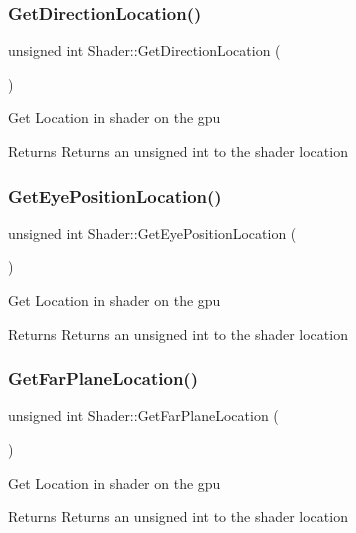 \subsubsection{\texorpdfstring{GetDirectionLocation()}{GetDirectionLocation()}}
{\footnotesize\ttfamily unsigned int Shader\+::\+Get\+Direction\+Location (\begin{DoxyParamCaption}{ }\end{DoxyParamCaption})}

Get Location in shader on the gpu \begin{DoxyReturn}{Returns}
Returns an unsigned int to the shader location 
\end{DoxyReturn}
\mbox{\label{class_shader_a653eeecb7ec14c82360ea54d1c4034f3}} 
\subsubsection{\texorpdfstring{GetEyePositionLocation()}{GetEyePositionLocation()}}
{\footnotesize\ttfamily unsigned int Shader\+::\+Get\+Eye\+Position\+Location (\begin{DoxyParamCaption}{ }\end{DoxyParamCaption})}

Get Location in shader on the gpu \begin{DoxyReturn}{Returns}
Returns an unsigned int to the shader location 
\end{DoxyReturn}
\mbox{\label{class_shader_a26b015dcb7ea6997ed2fbe038223ee83}} 
\subsubsection{\texorpdfstring{GetFarPlaneLocation()}{GetFarPlaneLocation()}}
{\footnotesize\ttfamily unsigned int Shader\+::\+Get\+Far\+Plane\+Location (\begin{DoxyParamCaption}{ }\end{DoxyParamCaption})}

Get Location in shader on the gpu \begin{DoxyReturn}{Returns}
Returns an unsigned int to the shader location 
\end{DoxyReturn}
\mbox{\label{class_shader_af5f8544bb3019444d39bb3d6630609cf}} 
